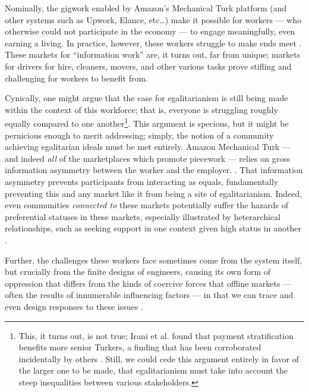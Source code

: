 \documentclass[11pt,titlepage]{article}
\begin{document}
Nominally, the gigwork enabled by Amazon's Mechanical Turk platform
(and other systems such as Upwork, Elance, etc\dots) make it possible for workers
--- who otherwise could not participate in the economy ---
to engage meaningfully, even earning a living.
In practice, however, these workers struggle to make ends meet
\cite{Ross}.
These markets for ``information work'' are, it turns out, far from unique;
markets for drivers for hire, cleaners, movers, and other various tasks
prove stifling and challenging for workers to benefit from.

Cynically,
one might argue that
the case for egalitarianism is still being made within the context of this workforce;
that is, everyone is struggling roughly equally compared to one another\footnote{This,
it turns out, is not true;
Irani et al. found that payment stratification benefits more senior Turkers,
a finding that has been corroborated incidentally by others
\cite{turkopticon}.
Still, we could cede this argument entirely in favor of the larger one to be made,
that egalitarianism must take into account the steep inequalities between various stakeholders.}.
This argument is specious, but it might be pernicious enough to merit addressing;
simply, the notion of a community achieving egalitarian ideals must be met entirely.
Amazon Mechanical Turk
--- and indeed \textit{all} of the marketplaces which promote piecework ---
relies on gross information asymmetry between the worker and the employer.
\cite{turkopticon,silberman2010ethics}.
That information asymmetry prevents participants from interacting as equals,
fundamentally preventing this and any market like it from being a site of egalitarianism.
Indeed, even communities \textit{connected to} these markets potentially suffer the hazards of
preferential statuses in these markets, especially illustrated by heterarchical relationships,
such as seeking support in one context given high status in another
\cite{dynamo}.


Further, the challenges these workers face sometimes come from the system itself,
but crucially from the finite designs of engineers,
causing its own form of oppression that differs from the kinds of coercive forces that offline markets
--- often the results of innumerable influencing factors ---
in that we can trace and even design responses to these issues
\cite{uberAlgorithm,turkopticon}.
\end{document}
